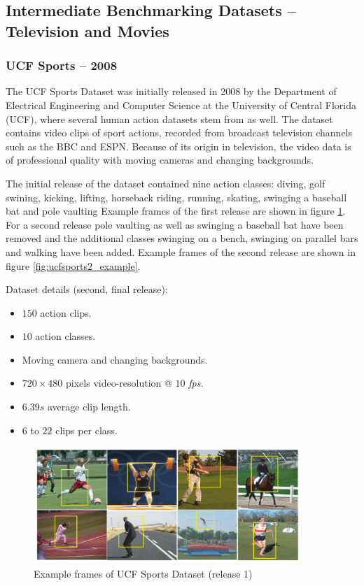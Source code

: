 \subsection{Intermediate Benchmarking Datasets -- Television and Movies}


\subsubsection{UCF Sports -- 2008}
The UCF Sports Dataset was initially released in 2008 by the Department of Electrical Engineering and Computer Science at the University of Central Florida (UCF), where several human action datasets stem from as well.
The dataset contains video clips of sport actions, recorded from broadcast television channels such as the BBC and ESPN.
Because of its origin in television, the video data is of professional quality with moving cameras and changing backgrounds.

The initial release of the dataset \cite{rodriguez_action_2008} contained nine action classes: diving, golf swining, kicking, lifting, horseback riding, running, skating, swinging a baseball bat and pole vaulting
Example frames of the first release are shown in figure \ref{fig:ucfsports1_example}.
For a second release \cite{soomro_action_2014} pole vaulting as well as swinging a baseball bat have been removed and the additional classes swinging on a bench, swinging on parallel bars and walking have been added.
Example frames of the second release are shown in figure \ref{fig:ucfsports2_example}.

Dataset details (second, final release): \cite{_center_????}
\begin{itemize}
    \item $150$ action clips.
    \item $10$ action classes.
    \item Moving camera and changing backgrounds.
    \item $720 \times 480$ pixels video-resolution @ $10$ \textit{fps}.
    \item $6.39s$ average clip length.
    \item $6$ to $22$ clips per class.
\end{itemize}

\begin{figure}[H]
    \centering
    \includegraphics[width=0.9\textwidth]{img_datasets/ucfsports1_example}
    \caption{Example frames of UCF Sports Dataset (release 1) \cite{rodriguez_action_2008}}
    \label{fig:ucfsports1_example}
\end{figure}


